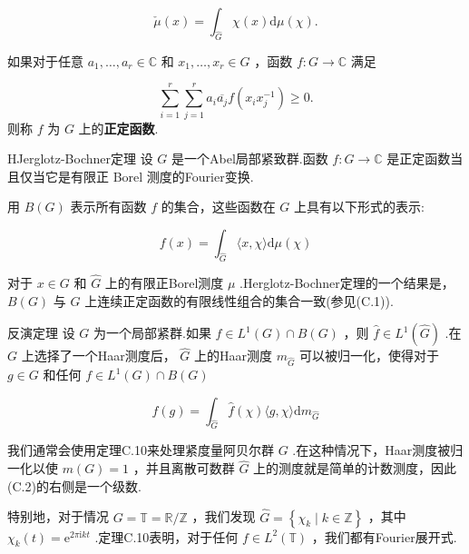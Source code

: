 \documentclass[lang=cn,a4paper,11pt,openany,scheme=chinese]{elegantbook}
\newcommand{\bluebf}[1]{\textcolor{structurecolor}{\textbf{#1}}}
\renewcommand{\geq}{\geqslant}
\begin{document}
\[
\check{\mu }\left( x\right)  = {\int }_{\widehat{G}}\chi \left( x\right) \mathrm{d}\mu \left( \chi \right) .
\]

如果对于任意 \({a}_{1},\ldots ,{a}_{r} \in  \mathbb{C}\) 和 \({x}_{1},\ldots ,{x}_{r} \in  G\) ，函数 \(f : G \rightarrow  \mathbb{C}\) 满足

\[
\mathop{\sum }\limits_{{i = 1}}^{r}\mathop{\sum }\limits_{{j = 1}}^{r}{a}_{i}\overline{{a}_{j}}f\left( {{x}_{i}{x}_{j}^{-1}}\right)  \geq  0. \tag{C.1}
\]
则称 \(f\) 为 \(G\) 上的\bluebf{正定函数}.\par

\begin{theorem}{HJerglotz-Bochner定理}
    设 \(G\) 是一个Abel局部紧致群.函数 \(f : G \rightarrow  \mathbb{C}\) 是正定函数当且仅当它是有限正 Borel 测度的Fourier变换.
\end{theorem}

用 \(B\left( G\right)\) 表示所有函数 \(f\) 的集合，这些函数在 \(G\) 上具有以下形式的表示:

\[
f\left( x\right)  = {\int }_{\widehat{G}}\langle x,\chi \rangle \mathrm{d}\mu \left( \chi \right)
\]

对于 \(x \in  G\) 和 \(\widehat{G}\) 上的有限正Borel测度 \(\mu\) .Herglotz-Bochner定理的一个结果是， \(B\left( G\right)\) 与 \(G\) 上连续正定函数的有限线性组合的集合一致(参见(C.1)).
\begin{theorem}{反演定理}
    设 \(G\) 为一个局部紧群.如果 \(f \in  {L}^{1}\left( G\right)  \cap  B\left( G\right)\) ，则 \(\widehat{f} \in  {L}^{1}\left( \widehat{G}\right)\) .在 \(G\) 上选择了一个Haar测度后， \(\widehat{G}\) 上的Haar测度 \({m}_{\widehat{G}}\) 可以被归一化，使得对于 \(g \in  G\) 和任何 \(f \in  {L}^{1}\left( G\right)  \cap  B\left( G\right)\)

\[
f\left( g\right)  = {\int }_{\widehat{G}}\widehat{f}\left( \chi \right) \langle g,\chi \rangle \mathrm{d}{m}_{\widehat{G}} \tag{C.2}
\]

\end{theorem}

我们通常会使用定理C.10来处理紧度量阿贝尔群 \(G\) .在这种情况下，Haar测度被归一化以使 \(m\left( G\right)  = 1\) ，并且离散可数群 \(\widehat{G}\) 上的测度就是简单的计数测度，因此(C.2)的右侧是一个级数.

特别地，对于情况 \(G = \mathbb{T} = \mathbb{R}/\mathbb{Z}\) ，我们发现 \(\widehat{G} = \left\{  {{\chi }_{k} \mid  k \in  \mathbb{Z}}\right\}\) ，其中 \({\chi }_{k}\left( t\right)  = {\mathrm{e}}^{{2\pi }\mathrm{i}{kt}}\) .定理C.10表明，对于任何 \(f \in  {L}^{2}\left( \mathbb{T}\right)\) ，我们都有Fourier展开式.
\end{document}
